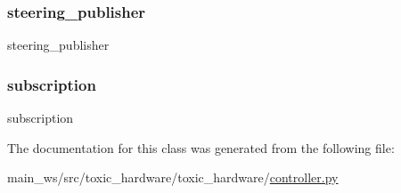 \subsubsection{\texorpdfstring{steering\+\_\+publisher}{steering\_publisher}}
{\footnotesize\ttfamily steering\+\_\+publisher}

\mbox{\label{classtoxic__hardware_1_1controller_1_1ControlSubscriber_a4b0698733c4dfaffe8e2b4cd952b6f82}} 
\subsubsection{\texorpdfstring{subscription}{subscription}}
{\footnotesize\ttfamily subscription}



The documentation for this class was generated from the following file\+:\begin{DoxyCompactItemize}
\item 
main\+\_\+ws/src/toxic\+\_\+hardware/toxic\+\_\+hardware/\mbox{\hyperlink{controller_8py}{controller.\+py}}\end{DoxyCompactItemize}
